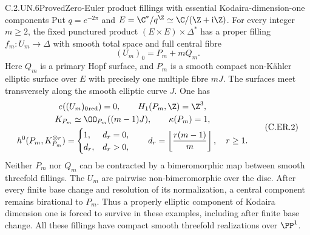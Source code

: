 \begin{statement}{C.2.UN.6}{Proved}{Zero-Euler product fillings with essential Kodaira-dimension-one components}
Put $q=e^{-2\pi}$ and $E=\C^*/q^{\Z}\simeq\C/(\Z+\mathrm i\Z)$.
For every integer $m\ge2$, the fixed punctured product
$(E\times E)\times\Delta^*$ has a proper filling
$f_m:U_m\to\Delta$ with smooth total space and full central fibre
\[
                    (U_m)_0=P_m+mQ_m.             \tag{C.ER.1}
\]
Here $Q_m$ is a primary Hopf surface, and $P_m$ is a smooth compact
non-K\"ahler elliptic surface over $E$ with precisely one multiple
fibre $mJ$. The surfaces meet transversely along the smooth elliptic
curve $J$. One has
\[
 \begin{gathered}
 e((U_m)_0{}_{\rm red})=0,\qquad H_1(P_m,\Z)=\Z^3,\\
 K_{P_m}\simeq\OO_{P_m}((m-1)J),\qquad \kappa(P_m)=1,\\
 h^0(P_m,K_{P_m}^{\otimes r})=
 \begin{cases}
 1,&d_r=0,\\
 d_r,&d_r>0,
 \end{cases}
 \qquad d_r=\left\lfloor\frac{r(m-1)}m\right\rfloor,
 \quad r\ge1.
 \end{gathered}                                   \tag{C.ER.2}
\]
Neither $P_m$ nor $Q_m$ can be contracted by a bimeromorphic map
between smooth threefold fillings. The $U_m$ are pairwise
non-bimeromorphic over the disc. After every finite base change and
resolution of its normalization, a central component remains
birational to $P_m$. Thus a properly elliptic component of Kodaira
dimension one is forced to survive in these examples, including
after finite base change. All these fillings have compact smooth
threefold realizations over $\PP^1$.
\end{statement}
